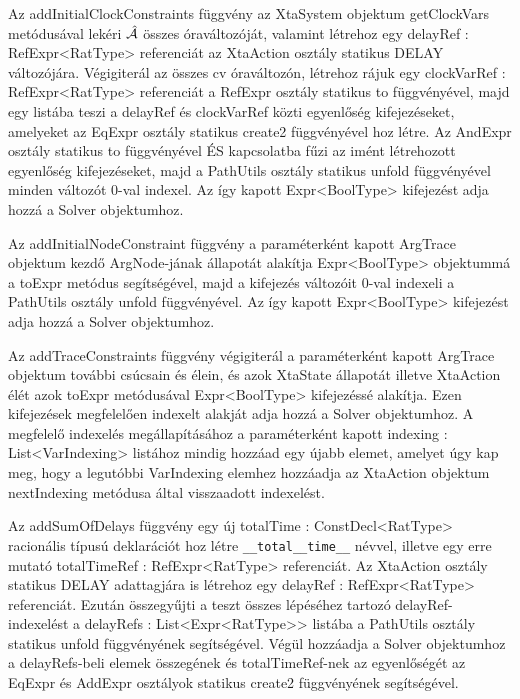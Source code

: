 Az \textsf{addInitialClockConstraints} függvény az \textsf{XtaSystem} objektum \textsf{getClockVars} metódusával lekéri $\hat{\mathcal{A}}$ összes óraváltozóját, valamint létrehoz egy \textsf{delayRef : RefExpr<RatType>} referenciát az \textsf{XtaAction} osztály statikus \textsf{DELAY} változójára. Végigiterál az összes \textsf{cv} óraváltozón, létrehoz rájuk egy \textsf{clockVarRef : RefExpr<RatType>} referenciát a \textsf{RefExpr} osztály statikus \textsf{to} függvényével, majd egy listába teszi a \textsf{delayRef} és \textsf{clockVarRef} közti egyenlőség kifejezéseket, amelyeket az \textsf{EqExpr} osztály statikus \textsf{create2} függvényével hoz létre. Az \textsf{AndExpr} osztály statikus \textsf{to} függvényével ÉS kapcsolatba fűzi az imént létrehozott egyenlőség kifejezéseket, majd a \textsf{PathUtils} osztály statikus \textsf{unfold} függvényével minden változót 0-val indexel. Az így kapott \textsf{Expr<BoolType>} kifejezést adja hozzá a \textsf{Solver} objektumhoz.

Az \textsf{addInitialNodeConstraint} függvény a paraméterként kapott \textsf{ArgTrace} objektum kezdő \textsf{ArgNode}-jának állapotát alakítja \textsf{Expr<BoolType>} objektummá a \textsf{toExpr} metódus segítségével, majd a kifejezés változóit 0-val indexeli a \textsf{PathUtils} osztály \textsf{unfold} függvényével. Az így kapott \textsf{Expr<BoolType>} kifejezést adja hozzá a \textsf{Solver} objektumhoz.

Az \textsf{addTraceConstraints} függvény végigiterál a paraméterként kapott \textsf{ArgTrace} objektum további csúcsain és élein, és azok \textsf{XtaState} állapotát illetve \textsf{XtaAction} élét azok \textsf{toExpr} metódusával \textsf{Expr<BoolType>} kifejezéssé alakítja. Ezen kifejezések megfelelően indexelt alakját adja hozzá a \textsf{Solver} objektumhoz. A megfelelő indexelés megállapításához a paraméterként kapott \textsf{indexing : List<VarIndexing>} listához mindig hozzáad egy újabb elemet, amelyet úgy kap meg, hogy a legutóbbi \textsf{VarIndexing} elemhez hozzáadja az \textsf{XtaAction} objektum \textsf{nextIndexing} metódusa által visszaadott indexelést.

Az \textsf{addSumOfDelays} függvény egy új \textsf{totalTime : ConstDecl<RatType>} racionális típusú deklarációt hoz létre \texttt{\_\_total\_\_time\_\_} névvel, illetve egy erre mutató \textsf{totalTimeRef : RefExpr<RatType>} referenciát. Az \textsf{XtaAction} osztály statikus \textsf{DELAY} adattagjára is létrehoz egy \textsf{delayRef : RefExpr<RatType>} referenciát. Ezután összegyűjti a teszt összes lépéséhez tartozó \textsf{delayRef}-indexelést a \textsf{delayRefs : List<Expr<RatType>{}>} listába a \textsf{PathUtils} osztály statikus \textsf{unfold} függvényének segítségével. Végül hozzáadja a \textsf{Solver} objektumhoz a \textsf{delayRefs}-beli elemek összegének és \textsf{totalTimeRef}-nek az egyenlőségét az \textsf{EqExpr} és \textsf{AddExpr} osztályok statikus \textsf{create2} függvényének segítségével.

